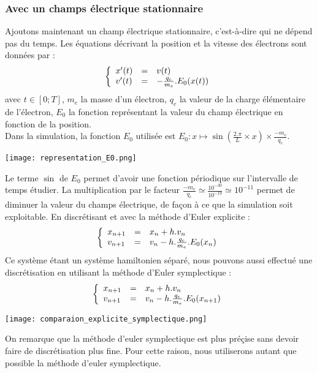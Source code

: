 \documentclass{article}
\begin{document}
\subsubsection{Avec un champs électrique stationnaire}
Ajoutons maintenant un champ électrique stationnaire, c'est-à-dire qui ne dépend pas du temps. Les équations décrivant la position et la vitesse des électrons sont données par :
$$
\left \{
   \begin{array}{l l l}
      x'(t)  & = & v(t) \\
      v'(t)  & = & -\frac{q_e}{m_e}.E_0(x(t)) \\
	\end{array}
\right.
$$
avec $t \in [0;T]$, $m_e$ la masse d'un électron, $q_e$ la valeur de la charge élémentaire de l'électron, $E_0$ la fonction représentant la valeur du champ électrique en fonction de la position.\\
Dans la simulation, la fonction $E_0$ utilisée est $E_0 : x \mapsto \sin(\frac{2 . \pi}{L} \times x) \times \frac{-m_e}{q_e}$.\\
\begin{center}
\texttt{[image: representation\_E0.png]}
\end{center}
Le terme $\sin$ de $E_0$ permet d'avoir une fonction périodique sur l'intervalle de temps étudier. La multiplication par le facteur $\frac{-m_e}{q_e} \simeq \frac{10^{-30}}{10^{-19}} \simeq 10^{-11}$ permet de diminuer la valeur du champs électrique, de façon  à ce que la simulation soit exploitable.
En discrétisant et avec la méthode d'Euler explicite :
$$
\left \{
   \begin{array}{l l l}
      x_{n+1}  & = & x_n + h.v_n \\
      v_{n+1}  & = & v_n - h.\frac{q_e}{m_e}.E_0(x_n) \\
	\end{array}
\right.
$$
Ce système étant un système hamiltonien séparé, nous pouvons aussi effectué une discrétisation en utilisant la méthode d'Euler symplectique :
$$
\left \{
   \begin{array}{l l l}
      x_{n+1}  & = & x_n + h.v_n \\
      v_{n+1}  & = & v_n - h.\frac{q_e}{m_e}.E_0(x_{n+1}) \\
	\end{array}
\right.
$$
\begin{center}
\texttt{[image: comparaion\_explicite\_symplectique.png]}
\end{center}
On remarque que la méthode d'euler symplectique est plus préçise sans devoir faire de discrétisation plus fine. Pour cette raison, nous utiliserons autant que possible la méthode d'euler symplectique.
\end{document}
